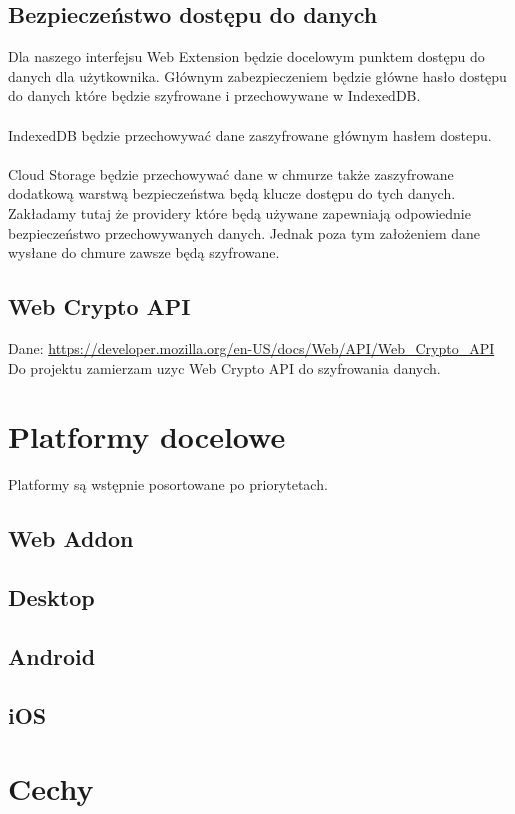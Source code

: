 \documentclass[11pt, a4paper]{article}
\begin{document}
\subsection{Bezpieczeństwo dostępu do danych}

Dla naszego interfejsu Web Extension będzie docelowym punktem dostępu do danych dla użytkownika. 
Głównym zabezpieczeniem będzie główne hasło dostępu do danych które będzie szyfrowane i przechowywane w IndexedDB. \\
\\
IndexedDB będzie przechowywać dane zaszyfrowane głównym hasłem dostepu. \\
\\
Cloud Storage będzie przechowywać dane w chmurze także zaszyfrowane dodatkową warstwą bezpieczeństwa będą klucze dostępu do tych danych.
Zakładamy tutaj że providery które będą używane zapewniają odpowiednie bezpieczeństwo przechowywanych danych.
Jednak poza tym założeniem dane wysłane do chmure zawsze będą szyfrowane.



\subsection{Web Crypto API}
Dane: \url{https://developer.mozilla.org/en-US/docs/Web/API/Web_Crypto_API} \\

Do projektu zamierzam uzyc Web Crypto API do szyfrowania danych.

\section{Platformy docelowe}
Platformy są wstępnie posortowane po priorytetach.
\subsection{Web Addon}
\subsection{Desktop}
\subsection{Android}
\subsection{iOS}

\section{Cechy}
\end{document}
